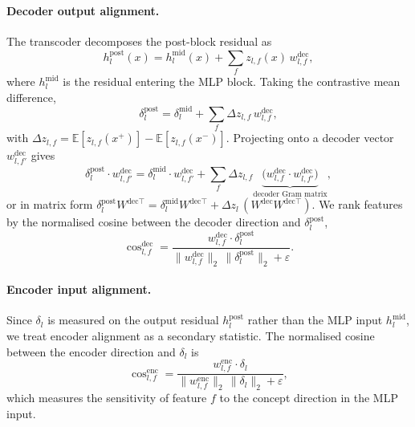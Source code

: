 \paragraph{Decoder output alignment.}
The transcoder decomposes the post-block residual as
\begin{equation}
h_l^{\mathrm{post}}(x)
= h_l^{\mathrm{mid}}(x) + \sum_f z_{l,f}(x)\,w_{l,f}^{\mathrm{dec}},
\label{eq:transcoder_decomp}
\end{equation}
where \(h_l^{\mathrm{mid}}\) is the residual entering the MLP block.
Taking the contrastive mean difference,
\begin{equation}
\delta_l^{\mathrm{post}}
= \delta_l^{\mathrm{mid}} + \sum_f \Delta z_{l,f}\,w_{l,f}^{\mathrm{dec}},
\label{eq:delta_decomp}
\end{equation}
with \(\Delta z_{l,f}=\mathbb{E}[z_{l,f}(x^+)]-\mathbb{E}[z_{l,f}(x^-)]\).
Projecting onto a decoder vector \(w_{l,f'}^{\mathrm{dec}}\) gives
\begin{equation}
\delta_l^{\mathrm{post}}\cdot w_{l,f'}^{\mathrm{dec}}
=
\delta_l^{\mathrm{mid}}\cdot w_{l,f'}^{\mathrm{dec}}
+
\sum_f \Delta z_{l,f}
\underbrace{\bigl(w_{l,f}^{\mathrm{dec}}\cdot w_{l,f'}^{\mathrm{dec}}\bigr)}_{\text{decoder Gram matrix}},
\label{eq:dec_gram}
\end{equation}
or in matrix form \(\delta_l^{\mathrm{post}} W^{\mathrm{dec}\top} = \delta_l^{\mathrm{mid}} W^{\mathrm{dec}\top} + \Delta z_l\,(W^{\mathrm{dec}}W^{\mathrm{dec}\top})\).
 We rank features by the normalised cosine between the decoder direction and \(\delta_l^{\mathrm{post}}\),
\begin{equation}
\operatorname{cos}_{l,f}^{\mathrm{dec}}
=
\frac{w_{l,f}^{\mathrm{dec}} \cdot \delta_l^{\mathrm{post}}}
     {\lVert w_{l,f}^{\mathrm{dec}}\rVert_2\,\lVert\delta_l^{\mathrm{post}}\rVert_2 + \varepsilon}.
\label{eq:decoder_cosine}
\end{equation}

\paragraph{Encoder input alignment.}
Since \(\delta_l\) is measured on the output residual \(h_l^{\mathrm{post}}\) rather
than the MLP input \(h_l^{\mathrm{mid}}\), we treat encoder alignment as a secondary
statistic. The normalised cosine between the encoder direction and \(\delta_l\) is
\begin{equation}
\operatorname{cos}_{l,f}^{\mathrm{enc}}
=
\frac{w_{l,f}^{\mathrm{enc}} \cdot \delta_l}
     {\lVert w_{l,f}^{\mathrm{enc}}\rVert_2\,\lVert\delta_l\rVert_2 + \varepsilon},
\label{eq:encoder_cosine}
\end{equation}
which measures the sensitivity of feature \(f\) to the concept direction in the MLP input.

